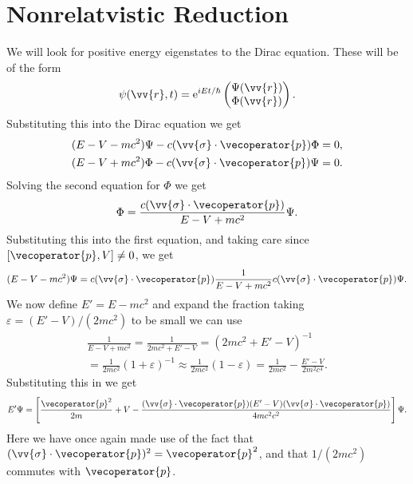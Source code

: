 \documentclass[fleqn]{NotesClass}
\newcommand*{\e}{\mathrm{e}}
\begin{document}
    \section{Nonrelatvistic Reduction}
    We will look for positive energy eigenstates to the Dirac equation.
    These will be of the form
    \begin{equation}
        \psi(\vv{r}, t) = \e^{iEt/\hbar}
        \begin{pmatrix}
            \Psi(\vv{r})\\ \Phi(\vv{r})
        \end{pmatrix}
        .
    \end{equation}
    Substituting this into the Dirac equation we get
    \begin{align}
        (E - V - mc^2) \Psi - c(\vv{\sigma} \cdot \vecoperator{p})\Phi &= 0,\\
        (E - V + mc^2) \Phi - c(\vv{\sigma} \cdot \vecoperator{p})\Psi &= 0.
    \end{align}
    Solving the second equation for \(\Phi\) we get
    \begin{equation}
        \Phi = \frac{c(\vv{\sigma} \cdot \vecoperator{p})}{E - V + mc^2} \Psi.
    \end{equation}
    Substituting this into the first equation, and taking care since \([\vecoperator{p}, V] \ne 0\), we get
    \begin{equation}
        (E - V - mc^2) \Psi = c(\vv{\sigma} \cdot \vecoperator{p}) \frac{1}{E - V + mc^2} c(\vv{\sigma} \cdot \vecoperator{p}) \Psi.
    \end{equation}
    We now define \(E' = E - mc^2\) and expand the fraction taking \(\varepsilon = (E' - V)/(2mc^2)\) to be small we can use
    \begin{multline}
        \frac{1}{E - V + mc^2} = \frac{1}{2mc^2 + E' - V} = (2mc^2 + E' - V)^{-1}\\
        = \frac{1}{2mc^2}\left( 1 + \varepsilon \right)^{-1}
        \approx \frac{1}{2mc^2} \left( 1 - \varepsilon \right) = \frac{1}{2mc^2} - \frac{E' - V}{2m^2c^4}.
    \end{multline}
    Substituting this in we get
    \begin{equation}
        E' \Psi = \left[ \frac{\vecoperator{p}^2}{2m} + V - \frac{(\vv{\sigma} \cdot \vecoperator{p})(E' - V)(\vv{\sigma} \cdot \vecoperator{p})}{4mc^2c^2} \right]\Psi.
    \end{equation}
    Here we have once again made use of the fact that \((\vv{\sigma} \cdot \vecoperator{p})^2 = \vecoperator{p}^2\), and that \(1/(2mc^2)\) commutes with \(\vecoperator{p}\).
    
\end{document}
